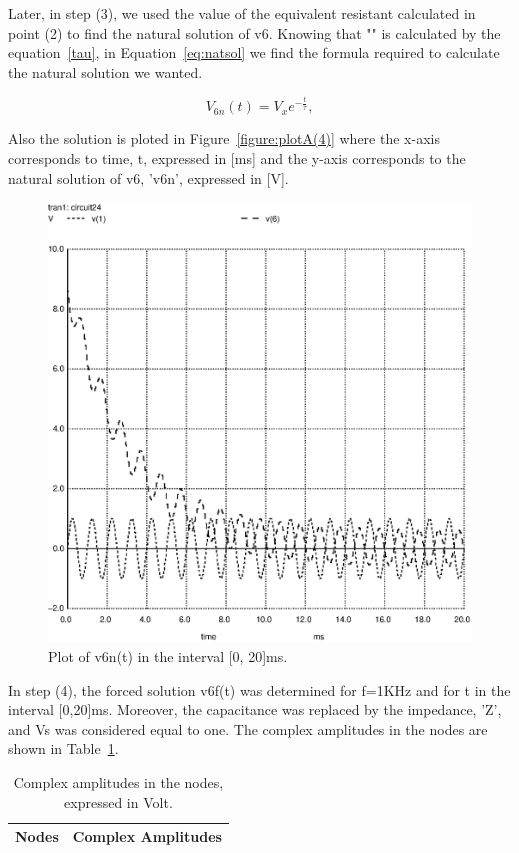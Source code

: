 Later, in step (3), we used the value of the equivalent resistant calculated in point (2) to find the natural solution of v6. Knowing that "\tau" is calculated by the equation~\ref{tau}, in Equation~\ref{eq:natsol} we find the formula required to calculate the natural solution we wanted. 

\begin{equation}
  V_{6n}(t) = V_{x}e^{-\frac{t}{\tau}},
  \label{eq:natsol}
\end{equation}

Also the solution is ploted in Figure~\ref{figure:plotA(4)} where the x-axis corresponds to time, t, expressed in [ms] and the y-axis corresponds to the natural solution of v6, 'v6n', expressed in [V].

\begin{figure}[h] \centering
\includegraphics[width=0.8\linewidth]{forcedsolution.eps}
\caption{Plot of v6n(t) in the interval [0, 20]ms.}
\label{fig:plotA(4)}
\end{figure}

In step (4), the forced solution v6f(t) was determined for f=1KHz and for t in the interval [0,20]ms. Moreover, the capacitance was replaced by the impedance, 'Z', and Vs was considered equal to one. The complex amplitudes in the nodes are shown in Table~\ref{tab:TA4}.

\begin{table}[h]
  \centering
  \begin{tabular}{|l|r|}
    \hline    
    {\bf Nodes} & {\bf Complex Amplitudes} \\ \hline
    
  \end{tabular}
  \caption{Complex amplitudes in the nodes, expressed in Volt.}
  \label{tab:TA4}
\end{table}

